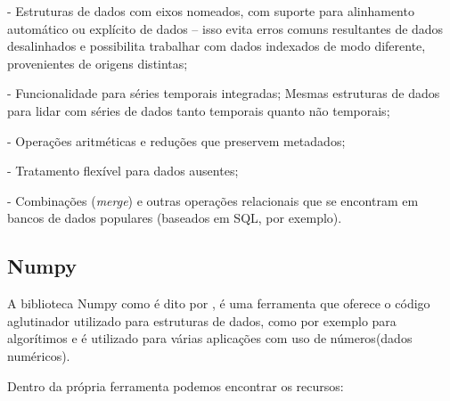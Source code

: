 \begin{citacao}
        \par - Estruturas de dados com eixos nomeados, com suporte para alinhamento automático ou explícito de dados – isso evita erros comuns resultantes de dados desalinhados e possibilita trabalhar com dados indexados de modo diferente, provenientes de origens distintas;
        \par - Funcionalidade para séries temporais integradas;
        Mesmas estruturas de dados para lidar com séries de dados tanto temporais quanto não temporais;
        \par - Operações aritméticas e reduções que preservem metadados;
        \par - Tratamento flexível para dados ausentes;
        \par - Combinações (\textit{merge}) e outras operações relacionais que se encontram em bancos de dados populares (baseados em SQL, por exemplo).
\end{citacao}

\subsection{Numpy}\label{sec:Numpy}
A biblioteca Numpy como é dito por \textcite{mckinney2019}, é uma ferramenta que oferece o código aglutinador utilizado para estruturas de dados, como por exemplo para algorítimos e é utilizado para várias aplicações com uso de números(dados numéricos).
\par Dentro da própria ferramenta podemos encontrar os recursos:

